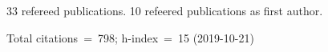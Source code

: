 33 refereed publications. 10 refeered publications as first author.

Total citations~=~798; h-index~=~15 (2019-10-21)
